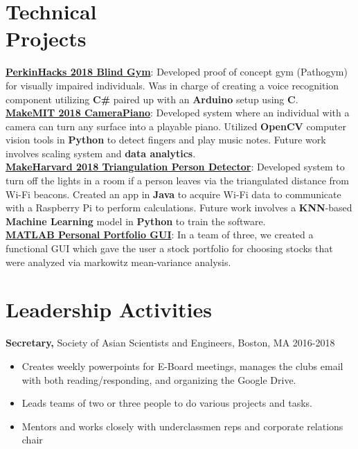 \documentclass[margin]{res}
\begin{document}
\begin{resume}
\section{Technical \\ Projects} 
\textbf{\underline{PerkinHacks 2018 Blind Gym}}: Developed proof of concept gym (Pathogym) for visually impaired individuals. Was in charge of creating a voice recognition component utilizing \textbf{C\#} paired up with an \textbf{Arduino} setup using \textbf{C}. \\
\textbf{\underline{MakeMIT 2018 CameraPiano}}: Developed system where an individual with a camera can turn any surface into a playable piano. Utilized \textbf{OpenCV} computer vision tools in \textbf{Python} to detect fingers and play music notes. Future work involves scaling system and \textbf{data analytics}.\\
\textbf{\underline{MakeHarvard 2018 Triangulation Person Detector}}: Developed system to turn off the lights in a room if a person leaves via the triangulated distance from Wi-Fi beacons. Created an app in \textbf{Java} to acquire Wi-Fi data to communicate with a Raspberry Pi to perform calculations. Future work involves a \textbf{KNN}-based \textbf{Machine Learning} model in \textbf{Python} to train the software. \\
\textbf{\underline{MATLAB Personal Portfolio GUI}}: In a team of three, we created a functional GUI which gave the user a stock portfolio for choosing stocks that were analyzed via markowitz mean-variance analysis. 			
			
			
			
			
			
\section{Leadership   Activities} 
               {\bf Secretary,} Society of Asian Scientists and Engineers, Boston, MA    \hfill         2016-2018
                \begin{itemize} \itemsep -0.5pt
                \item Creates weekly powerpoints for E-Board meetings, manages the clubs email with both reading/responding, and organizing the Google Drive.
                \item Leads teams of two or three people to do various projects and tasks.
              \item Mentors and works closely with underclassmen reps and corporate relations chair


\end{itemize}
\end{resume}
\end{document}

